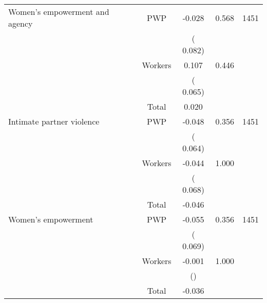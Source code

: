 \begin{tabular}{l*{4}{c}}
\cmidrule{2-3}
 Women's empowerment and agency                &       PWP     &             -0.028               &        0.568   & 1451                              \\ 
                               &                               &       (       0.082)                     & &                                                                             \\ 
                               &       Workers         &              0.107               &        0.446   &                                               \\ 
                               &                               &       (       0.065)                     & &                                                                             \\ 
\cmidrule{2-3}
                               &       Total           &              0.020               &   &                                               \\ 
\cmidrule{2-3}
 Intimate partner violence                &       PWP     &             -0.048               &        0.356   & 1451                              \\ 
                               &                               &       (       0.064)                     & &                                                                             \\ 
                               &       Workers         &             -0.044               &        1.000   &                                               \\ 
                               &                               &       (       0.068)                     & &                                                                             \\ 
\cmidrule{2-3}
                               &       Total           &             -0.046               &   &                                               \\ 
\cmidrule{2-3}
 Women's empowerment                &       PWP     &             -0.055               &        0.356   & 1451                              \\ 
                               &                               &       (       0.069)                     & &                                                                             \\ 
                               &       Workers         &             -0.001               &        1.000   &                                               \\ 
                               &                               &       ()                     & &                                                                             \\ 
\cmidrule{2-3}
                               &       Total           &             -0.036               &   &                                               \\ 
\cmidrule{2-3}
\hline \end{tabular}                                                                                                              